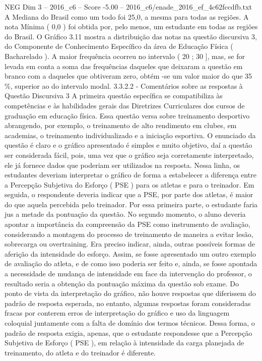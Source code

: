 \begin{textsample}{NEG Dim 3 – 2016\_c6 – Score -5.00 – 2016\_c6/enade\_2016\_ef\_4c62fccdfb.txt}
A Mediana do Brasil como um todo foi 25,0, a mesma para todas as regiões.
A nota Mínima ( 0,0 ) foi obtida por, pelo menos, um estudante em todas as regiões do Brasil.
O Gráfico 3.11 mostra a distribuição das notas na questão discursiva 3, do Componente de Conhecimento Específico da área de Educação Física ( Bacharelado ).
A maior frequência ocorreu no intervalo ( 20 ; 30 ], mas, se for levada em conta a soma das frequências daqueles que deixaram a questão em branco com a daqueles que obtiveram zero, obtém -se um valor maior do que 35 \%, superior ao do intervalo modal. 3.3.2.2 - Comentários sobre as respostas à Questão Discursiva 3 A primeira questão específica se compatibiliza às competências e às habilidades gerais das Diretrizes Curriculares dos cursos de graduação em educação física.
Essa questão versa sobre treinamento desportivo abrangendo, por exemplo, o treinamento de alto rendimento em clubes, em academias, o treinamento individualizado e a iniciação esportiva.
O enunciado da questão é claro e o gráfico apresentado é simples e muito objetivo, daí a questão ser considerada fácil, pois, uma vez que o gráfico seja corretamente interpretado, ele já fornece dados que poderiam ser utilizados na resposta.
Nessa linha, os estudantes deveriam interpretar o gráfico de forma a estabelecer a diferença entre a Percepção Subjetiva do Esforço ( PSE ) para os atletas e para o treinador.
Em seguida, o respondente deveria indicar que a PSE, por parte dos atletas, é maior do que aquela percebida pelo treinador.
Por essa primeira parte, o estudante faria jus a metade da pontuação da questão.
No segundo momento, o aluno deveria apontar a importância da compreensão da PSE como instrumento de avaliação, considerando a montagem do processo de treinamento de maneira a evitar lesão, sobrecarga ou overtraining.
Era preciso indicar, ainda, outras possíveis formas de aferição da intensidade do esforço.
Assim, se fosse apresentado um outro exemplo de avaliação do atleta, e de como isso poderia ser feito e, ainda, se fosse apontada a necessidade de mudança de intensidade em face da intervenção do professor, o resultado seria a obtenção da pontuação máxima da questão sob exame.
Do ponto de vista da interpretação do gráfico, não houve respostas que diferissem do padrão de resposta esperada, no entanto, algumas respostas foram consideradas fracas por conterem erros de interpretação do gráfico e uso da linguagem coloquial juntamente com a falta de domínio dos termos técnicos.
Dessa forma, o padrão de resposta exigia, apenas, que o estudante respondesse que a Percepção Subjetiva de Esforço ( PSE ), em relação à intensidade da carga planejada de treinamento, do atleta e do treinador é diferente.

\end{textsample}
